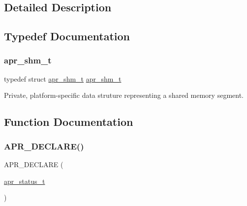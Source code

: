 \subsection{Detailed Description}


\subsection{Typedef Documentation}
\mbox{\label{group__apr__shm_ga79e8c16bdeaf7ade4ef0f935249e7c2f}} 
\subsubsection{\texorpdfstring{apr\+\_\+shm\+\_\+t}{apr\_shm\_t}}
{\footnotesize\ttfamily typedef struct \mbox{\hyperlink{structapr__shm__t}{apr\+\_\+shm\+\_\+t}} \mbox{\hyperlink{structapr__shm__t}{apr\+\_\+shm\+\_\+t}}}

Private, platform-\/specific data struture representing a shared memory segment. 

\subsection{Function Documentation}
\mbox{\label{group__apr__shm_ga9556068323f037a43a12d5a786531bfe}} 
\subsubsection{\texorpdfstring{A\+P\+R\+\_\+\+D\+E\+C\+L\+A\+R\+E()}{APR\_DECLARE()}\hspace{0.1cm}{\footnotesize\ttfamily [1/3]}}
{\footnotesize\ttfamily A\+P\+R\+\_\+\+D\+E\+C\+L\+A\+RE (\begin{DoxyParamCaption}\item[{\mbox{\hyperlink{group__apr__errno_gaf76ee4543247e9fb3f3546203e590a6c}{apr\+\_\+status\+\_\+t}}}]{ }\end{DoxyParamCaption})}

